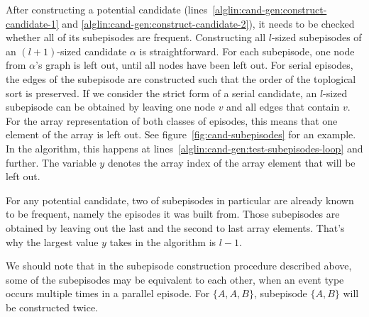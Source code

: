 \begin{algorithmic}[0]
\EndFor
\end{algorithmic}

After constructing a potential candidate (lines~\ref{alglin:cand-gen:construct-candidate-1} and \ref{alglin:cand-gen:construct-candidate-2}), it needs to be checked whether all of its subepisodes are frequent.
Constructing all $ l $-sized subepisodes of an $ (l + 1) $-sized candidate $ \alpha $ is straightforward. For each subepisode, one node from $ \alpha $'s graph is left out, until all nodes have been left out. For serial episodes, the edges of the subepisode are constructed such that the order of the toplogical sort is preserved. If we consider the strict form of a serial candidate, an $ l $-sized subepisode can be obtained by leaving one node $ v $ and all edges that contain $ v $. For the array representation of both classes of episodes, this means that one element of the array is left out. See figure~\ref{fig:cand-subepisodes} for an example. In the algorithm, this happens at lines~\ref{alglin:cand-gen:test-subepisodes-loop} and further. The variable $ y $ denotes the array index of the array element that will be left out.

For any potential candidate, two of subepisodes in particular are already known to be frequent, namely the episodes it was built from. Those subepisodes are obtained by leaving out the last and the second to last array elements. That's why the largest value $ y $ takes in the algorithm is $ l - 1 $.

We should note that in the subepisode construction procedure described above, some of the subepisodes may be equivalent to each other, when an event type occurs multiple times in a parallel episode. For $ \{ A, A, B \} $, subepisode $ \{ A, B \} $ will be constructed twice.


